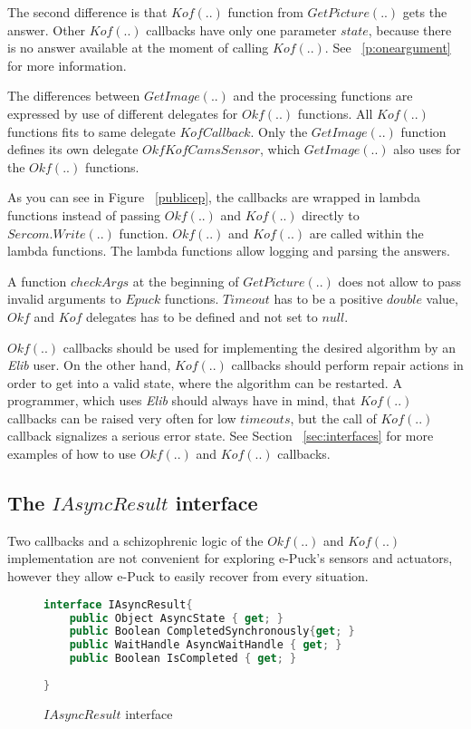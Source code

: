 	The second difference is that $Kof(..)$ function from $GetPicture(..)$ gets the answer. 
	Other $Kof(..)$ callbacks have only one parameter $state$, 
	because there is no answer available at the moment of calling $Kof(..)$.
	See ~\ref{p:oneargument} for more information.

	The differences between $GetImage(..)$ and the processing functions are expressed by use of different
	delegates for $Okf(..)$ functions. All $Kof(..)$ functions fits to same delegate $KofCallback$. 
	Only the $GetImage(..)$ function defines its own delegate $OkfKofCamsSensor$, 
	which $GetImage(..)$ also uses for the $Okf(..)$ functions.

	As you can see in Figure ~\ref{publicep}, the callbacks are wrapped in lambda functions \cite{lambda}
	instead of passing $Okf(..)$ and $Kof(..)$ directly to $Sercom.Write(..)$ function.
	$Okf(..)$ and $Kof(..)$  are called within the lambda functions.
	The lambda functions allow logging and parsing the answers.

	A function $checkArgs$ at the beginning of $GetPicture(..)$ does not allow to pass invalid arguments
	to $Epuck$ functions. $Timeout$ has to be a positive $double$ value, $Okf$ and $Kof$ delegates 
	has to be defined and not set to $null$.

	$Okf(..)$ callbacks should be used for implementing the desired algorithm by an {\it Elib} user.
	On the other hand, $Kof(..)$ callbacks should perform repair actions in order to get into a valid state,
	where the algorithm can be restarted. A programmer, which uses {\it Elib} should always have in mind,
	that $Kof(..)$ callbacks can be raised very often for low $timeouts$,
	but the call of $Kof(..)$ callback signalizes a serious error state.
	See Section ~\ref{sec:interfaces} for more examples of how to use $Okf(..)$ and $Kof(..)$ callbacks.


\subsection{The $IAsyncResult$ interface} \label{sec:iasync}
	Two callbacks and a schizophrenic logic of the $Okf(..)$ and $Kof(..)$ implementation are not
	convenient for exploring e-Puck's sensors and actuators, 
	however they allow e-Puck to easily recover from every situation.

\begin{figure}[!hbp]
\begin{lstlisting}[language=cs]
interface IAsyncResult{
	public Object AsyncState { get; }
	public Boolean CompletedSynchronously{get; } 
	public WaitHandle AsyncWaitHandle { get; }
	public Boolean IsCompleted { get; }
	
}
\end{lstlisting}
\caption{$IAsyncResult$ interface}
\label{interface}
\end{figure}

